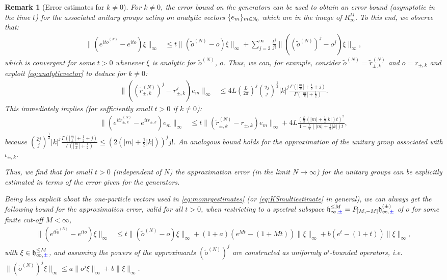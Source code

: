 \documentclass[a4paper, 11pt]{article}
\newcommand{\fh}{\mathfrak{h}}
\DeclareMathOperator{\1}{\mathds{1}}
\newtheorem{rem}[thm]{Remark}
\begin{document}
\begin{rem}[Error estimates for $k\neq0$]
\label{rem:conformalerror}
For $k\neq 0$, the error bound on the generators can be used to obtain an error bound (asymptotic in the time $t$) for the associated unitary groups acting on analytic vectors $\{e_{m}\}_{m\in\mathbb{N}_{0}}$ which are in the image of $R^{M}_{\infty}$. To this end, we observe that:
\begin{align*}
\|(e^{it\tilde{o}^{(N)}}-e^{ito})\xi\|_{\infty} & \leq t \|(\tilde{o}^{(N)}-o)\xi\|_{\infty}+\sum_{j=2}^{\infty}\tfrac{t^{j}}{j!}\|((\tilde{o}^{(N)})^{j}-o^{j})\xi\|_{\infty},
\end{align*}
which is convergent for some $t>0$ whenever $\xi$ is analytic for $\tilde{o}^{(N)}$, $o$. Thus, we can, for example, consider $\tilde{o}^{(N)}=\tilde{r}^{(N)}_{\pm,k}$ and $o = r_{\pm,k}$ and exploit \eqref{eq:analyticvector} to deduce for $k\neq0$:
\begin{align*}
\|((\tilde{r}^{(N)}_{\pm,k})^{j}-r_{\pm,k}^{j})e_{m}\|_{\infty} & \leq 4L(\tfrac{L}{2\pi})^{j}\binom{2j}{j}^{\frac{1}{2}}|k|^{j}\tfrac{\Gamma(|\frac{m}{k}|+\frac{1}{2}+j)}{\Gamma(|\frac{m}{k}|+\frac{1}{2})}.
\end{align*}
This immediately implies (for sufficiently small $t>0$ if $k\neq 0$):
\begin{align}
\label{eq:conformalerror}
\|(e^{it\tilde{r}^{(N)}_{\pm,k}}-e^{itr_{\pm,k}})e_{m}\|_{\infty} & \leq t \|(\tilde{r}^{(N)}_{\pm,k}-r_{\pm,k})e_{m}\|_{\infty} + 4L\frac{(\tfrac{L}{\pi}(|m|+\frac{1}{2}|k|)t)^{2}}{1-\tfrac{L}{\pi}(|m|+\frac{1}{2}|k|)t} ,
\end{align}
because $\binom{2j}{j}^{\frac{1}{2}}|k|^{j}\tfrac{\Gamma(|\frac{m}{k}|+\frac{1}{2}+j)}{\Gamma(|\frac{m}{k}|+\frac{1}{2})} \leq (2(|m|+\tfrac{1}{2}|k|))^{j}j!$. An analogous bound holds for the approximation of the unitary group associated with $\iota_{\pm,k}$.

\medskip

Thus, we find that for small $t>0$ (independent of $N$) the approximation error (in the limit $N\rightarrow\infty$) for the unitary groups can be explicitly estimated in terms of the error given for the generators.

\medskip

Being less explicit about the one-particle vectors used in \eqref{eq:momrgestimates} (or \eqref{eq:KSmultiestimate} in general), we can always get the following bound for the approximation error, valid for all $t>0$, when restricting to a spectral subspace $\fh_{\infty,{\color{blue}\pm}}^{\leq M} = P_{[M,-M]}\fh^{(\pm)}_{\infty,{\color{blue}\pm}}$ of $o$ for some finite cut-off $M<\infty$, 
\begin{align*}
\|(e^{it\tilde{o}^{(N)}}\!-\!e^{ito})\xi\|_{\infty} & \!\leq\! t \|(\tilde{o}^{(N)}\!-\!o)\xi\|_{\infty}\!+\!(1\!+\!a)(e^{M t}\!-\!(1\!+\!M t))\|\xi\|_{\infty}\!+\!b(e^{t}\!-\!(1\!+\!t))\|\xi\|_{\infty},
\end{align*}
with $\xi\in\fh_{\infty,{\color{blue}\pm}}^{\leq M}$, and assuming the powers of the approximants $(\tilde{o}^{(N)})^{j}$ are constructed as uniformly $o^{j}$-bounded operators, i.e.~$\|(\tilde{o}^{(N)})^{j}\xi\|_{\infty}\leq a\|o^{j}\xi\|_{\infty}+b\|\xi\|_{\infty}$.
\end{rem}
\end{document}
